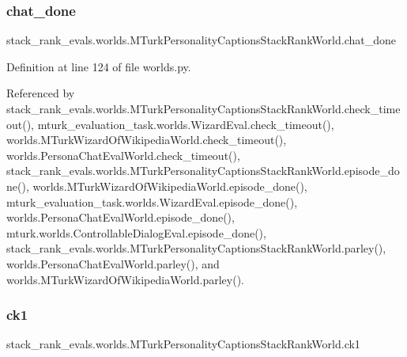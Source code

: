 \subsubsection{\texorpdfstring{chat\+\_\+done}{chat\_done}}
{\footnotesize\ttfamily stack\+\_\+rank\+\_\+evals.\+worlds.\+M\+Turk\+Personality\+Captions\+Stack\+Rank\+World.\+chat\+\_\+done}



Definition at line 124 of file worlds.\+py.



Referenced by stack\+\_\+rank\+\_\+evals.\+worlds.\+M\+Turk\+Personality\+Captions\+Stack\+Rank\+World.\+check\+\_\+timeout(), mturk\+\_\+evaluation\+\_\+task.\+worlds.\+Wizard\+Eval.\+check\+\_\+timeout(), worlds.\+M\+Turk\+Wizard\+Of\+Wikipedia\+World.\+check\+\_\+timeout(), worlds.\+Persona\+Chat\+Eval\+World.\+check\+\_\+timeout(), stack\+\_\+rank\+\_\+evals.\+worlds.\+M\+Turk\+Personality\+Captions\+Stack\+Rank\+World.\+episode\+\_\+done(), worlds.\+M\+Turk\+Wizard\+Of\+Wikipedia\+World.\+episode\+\_\+done(), mturk\+\_\+evaluation\+\_\+task.\+worlds.\+Wizard\+Eval.\+episode\+\_\+done(), worlds.\+Persona\+Chat\+Eval\+World.\+episode\+\_\+done(), mturk.\+worlds.\+Controllable\+Dialog\+Eval.\+episode\+\_\+done(), stack\+\_\+rank\+\_\+evals.\+worlds.\+M\+Turk\+Personality\+Captions\+Stack\+Rank\+World.\+parley(), worlds.\+Persona\+Chat\+Eval\+World.\+parley(), and worlds.\+M\+Turk\+Wizard\+Of\+Wikipedia\+World.\+parley().

\mbox{\label{classstack__rank__evals_1_1worlds_1_1MTurkPersonalityCaptionsStackRankWorld_a9b42f10d26500b54807e44f9340dd207}} 
\subsubsection{\texorpdfstring{ck1}{ck1}}
{\footnotesize\ttfamily stack\+\_\+rank\+\_\+evals.\+worlds.\+M\+Turk\+Personality\+Captions\+Stack\+Rank\+World.\+ck1}




